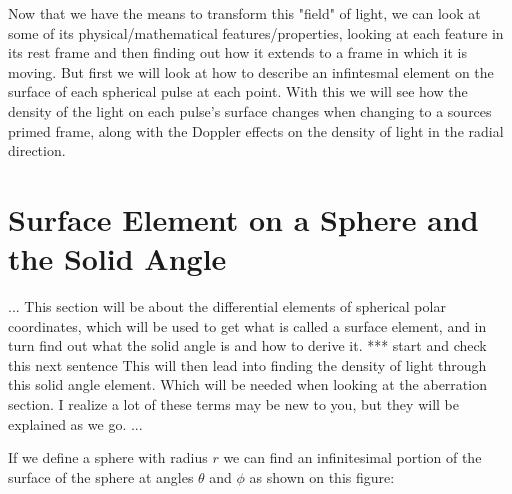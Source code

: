Now that we have the means to transform this "field" of light, we can look at some of its physical/mathematical features/properties, looking at each feature in its rest frame and then finding out how it extends to a frame in which it is moving.
But first we will look at how to describe an infintesmal element on the surface of each spherical pulse at each point.
With this we will see how the density of the light on each pulse's surface changes when changing to a sources primed frame, along with the Doppler effects on the density of light in the radial direction.

\section{Surface Element on a Sphere and the Solid Angle} \label{subsect: Surface Element on a Sphere}

...
This section will be about the differential elements of spherical polar coordinates, which will be used to get what is called a surface element, and in turn find out what the solid angle is and how to derive it.
*** start and check this next sentence
This will then lead into finding the density of light through this solid angle element.
Which will be needed when looking at the aberration section.
I realize a lot of these terms may be new to you, but they will be explained as we go.
...

If we define a sphere with radius $r$ we can find an infinitesimal portion of the surface of the sphere at angles ${\theta}$ and ${\phi}$ as shown on this figure:

